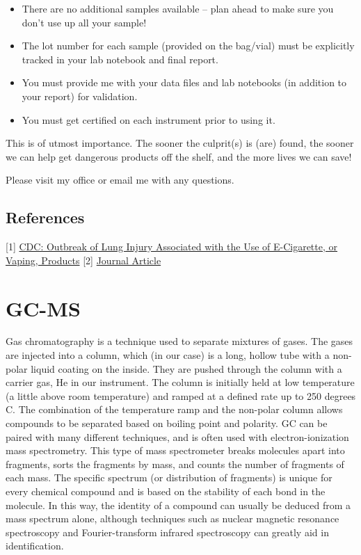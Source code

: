\documentclass[]{tufte-book}
\providecommand{\tightlist}{%
  \setlength{\itemsep}{0pt}\setlength{\parskip}{0pt}}
\begin{document}
\begin{itemize}
\tightlist
\item
  There are no additional samples available -- plan ahead to make sure you don't use up all your sample!\\
\item
  The lot number for each sample (provided on the bag/vial) must be explicitly tracked in your lab notebook and final report.\\
\item
  You must provide me with your data files and lab notebooks (in addition to your report) for validation.\\
\item
  You must get certified on each instrument prior to using it.
\end{itemize}

This is of utmost importance. The sooner the culprit(s) is (are) found, the sooner we can help get dangerous products off the shelf, and the more lives we can save!

Please visit my office or email me with any questions.

\hypertarget{references}{%
\subsection*{References}\label{references}}

{[}1{]} \href{https://www.cdc.gov/tobacco/basic_information/e-cigarettes/severe-lung-disease.html}{CDC: Outbreak of Lung Injury Associated with the Use of E-Cigarette, or Vaping, Products}
{[}2{]} \href{https://academic.oup.com/ntr/article/17/2/134/1258864}{Journal Article}

\newpage

\hypertarget{gc-ms}{%
\section{GC-MS}\label{gc-ms}}

Gas chromatography is a technique used to separate mixtures of gases. The gases are injected into a column, which (in our case) is a long, hollow tube with a non-polar liquid coating on the inside. They are pushed through the column with a carrier gas, He in our instrument. The column is initially held at low temperature (a little above room temperature) and ramped at a defined rate up to 250 degrees C. The combination of the temperature ramp and the non-polar column allows compounds to be separated based on boiling point and polarity. GC can be paired with many different techniques, and is often used with electron-ionization mass spectrometry. This type of mass spectrometer breaks molecules apart into fragments, sorts the fragments by mass, and counts the number of fragments of each mass. The specific spectrum (or distribution of fragments) is unique for every chemical compound and is based on the stability of each bond in the molecule. In this way, the identity of a compound can usually be deduced from a mass spectrum alone, although techniques such as nuclear magnetic resonance spectroscopy and Fourier-transform infrared spectroscopy can greatly aid in identification.
\end{document}

